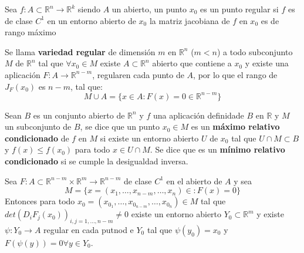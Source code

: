 \begin{definición}
    Sea $f: A \subset \mathbb{R}^n \to \mathbb{R}^k$ siendo $A$ un abierto, un punto $x_0$ es un punto regular si $f$ es de clase $C^1$ en un entorno abierto de $x_0$  la matriz jacobiana de $f$ en $x_0$ es de rango máximo
\end{definición}

\begin{definición}
    Se llama \textbf{variedad regular} de dimensión $m$ en $\mathbb{R}^n$ ($m < n$) a todo subconjunto $M$ de $\mathbb{R}^n$ tal que $\forall x_0 \in M$ existe $A \subset \mathbb{R}^n$ abierto  que contiene a $x_0$ y existe una aplicación $F: A \to \mathbb{R}^{n-m}$, regularen cada punto de $A$, por lo que el rango de $J_F(x_0)$ es $n-m$, tal que:
    $$M \cup A = \{x \in A : F(x) = 0 \in \mathbb{R}^{n-m}\}$$
\end{definición}

\begin{definición}
    Sean $B$ es un conjunto abierto de $\mathbb{R}^n$ y $f$ una aplicación definidade $B$ en $\mathbb{R}$ y $M$ un subconjunto de $B$, se dice que un punto $x_0 \in M$ es un \textbf{máximo relativo condicionado} de $f$ en $M$ si existe un entorno abierto $U$ de $x_0$ tal que $U \cap M \subset B$ y $f(x) \leq f(x_0)$ para todo $x \in U \cap M$. Se dice que es un \textbf{mínimo relativo condicionado} si se cumple la desigualdad inversa.
\end{definición}


\begin{lema}
    Sea $F:A\subset \mathbb{R}^{n-m} \times \mathbb{R}^m \to \mathbb{R}^{n-m}$ de clase $C^1$ en el abierto de $A$ y sea
    $$ M = \{x = (x_1, \ldots, x_{n-m}, \ldots,x_n) \in : F(x) = 0\}$$
    Entonces para todo $x_0 = (x_{0_1}, \ldots, x_{0_{n-m}}, \ldots, x_{0_n}) \in M$ tal que $det(D_iF_j(x_0))_{i, j = 1, \ldots, n-m} \neq 0$ existe un entorno abierto $Y_0 \subset \mathbb{R}^m$ y existe $\psi: Y_0 \to A$ regular en cada putnod e $Y_0$ tal que $\psi(y_0) = x_0$ y $F(\psi(y)) = 0 \forall y \in Y_0$.
\end{lema}

